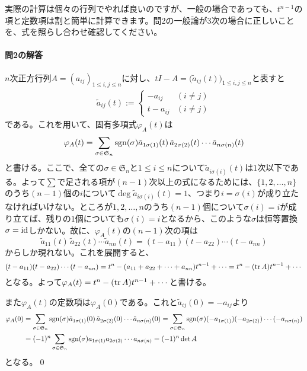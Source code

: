 実際の計算は個々の行列でやれば良いのですが、一般の場合であっても、$t^{n - 1}$の項と定数項は割と簡単に計算できます。問2の一般論が$3$次の場合に正しいことを、式を照らし合わせ確認してください。

\paragraph{問2の解答}

$n$次正方行列$A = (a_{ij})_{1 \leq i, j \leq n}$に対し、$tI - A = \bigl(\tilde{a}_{ij}(t)\bigr)_{1 \leq i, j \leq n}$と表すと
\begin{align*}
\tilde{a}_{ij}(t) :=
\begin{cases}
-a_{ij} & (i \neq j) \\
t - a_{ij} & (i \neq j)
\end{cases}
\end{align*}
である。これを用いて、固有多項式$\varphi_A(t)$は
\[
\varphi_A(t) = \sum_{\sigma \in \mathfrak{S}_n} \operatorname{sgn}(\sigma) \tilde{a}_{1 \sigma(1)}(t)\, \tilde{a}_{2 \sigma(2)}(t) \cdots \tilde{a}_{n \sigma(n)}(t)
\]
と書ける。ここで、全ての$\sigma \in \mathfrak{S}_n$と$1 \leq i \leq n$について$\tilde{a}_{i \sigma(i)}(t)$は$1$次以下である。よって$\sum$で足される項が$(n - 1)$次以上の式になるためには、$\{1, 2, \ldots, n\}$のうち$(n - 1)$個の$i$について$\deg \tilde{a}_{i\sigma(i)}(t) = 1$、つまり$i = \sigma(i)$が成り立たなければいけない。ところが$1, 2, \ldots, n$のうち$(n - 1)$個について$\sigma(i) = i$が成り立てば、残りの$1$個についても$\sigma(i) = i$となるから、このような$\sigma$は恒等置換$\sigma = \operatorname{id}$しかない。故に、$\varphi_A(t)$の$(n - 1)$次の項は
\[
\tilde{a}_{11}(t)\, \tilde{a}_{22}(t) \cdots \tilde{a}_{nn}(t) = (t - a_{11})(t - a_{22}) \cdots (t - a_{nn})
\]
からしか現れない。これを展開すると、
\[
(t - a_{11})(t - a_{22}) \cdots (t - a_{nn}) = t^n - (a_{11} + a_{22} + \cdots + a_{nn}) t^{n - 1} + \cdots
= t^n - (\operatorname{tr} A) t^{n - 1} + \cdots
\]
となる。よって$\varphi_A(t) = t^n - (\operatorname{tr} A) t^{n - 1} + \cdots$と書ける。

また$\varphi_A(t)$の定数項は$\varphi_A(0)$である。これと$\tilde{a}_{ij}(0) = -a_{ij}$より
\begin{align*}
\varphi_A(0)
&= \sum_{\sigma \in \mathfrak{S}_n} \operatorname{sgn}(\sigma) \tilde{a}_{1 \sigma(1)}(0)\, \tilde{a}_{2 \sigma(2)}(0) \cdots \tilde{a}_{n \sigma(n)}(0)
= \sum_{\sigma \in \mathfrak{S}_n} \operatorname{sgn}(\sigma) (-a_{1 \sigma(1)}) (-a_{2 \sigma(2)}) \cdots (-a_{n \sigma(n)}) \\
&= (-1)^n \sum_{\sigma \in \mathfrak{S}_n} \operatorname{sgn}(\sigma) a_{1 \sigma(1)} a_{2 \sigma(2)} \cdots a_{n \sigma(n)}
= (-1)^n \det A
\end{align*}
となる。\qed

